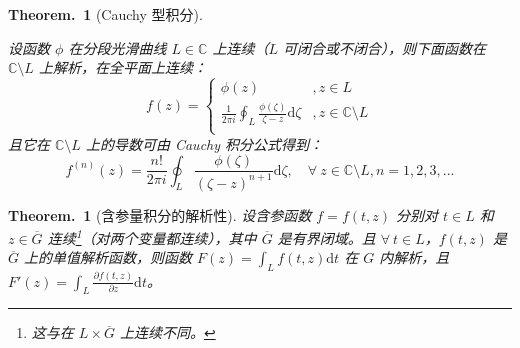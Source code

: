 \documentclass[UTF8]{report}
\def\C{\mathbb{C}}
\theoremstyle{MyLineTheoremStyle} %
\theoremstyle{MyBlockTheoremStyle} %
\newtheorem{BlockTheorem}[LineTheorem]{Theorem.\,} %
\theoremstyle{MySubsubsectionStyle} %
\begin{document}
\begin{BlockTheorem}[Cauchy 型积分]\label{Cauchy 型积分}

设函数 $\phi$ 在分段光滑曲线 $L \in \C$ 上连续（$L$ 可闭合或不闭合），则下面函数在 $\C \setminus L$ 上解析，在全平面上连续：
\begin{equation}
f (z) = 
\begin{cases}
    \phi(z) &, z \in L \\
    \displaystyle \frac{1}{2\pi i}\oint_{L} \frac{\phi(\zeta)}{\zeta - z} \mathrm{d} \zeta &, z \in \C \setminus L \\ 
\end{cases}
\end{equation}
且它在 $\C \setminus L$ 上的导数可由 Cauchy 积分公式得到：
\begin{equation}
f^{(n)}(z) = \frac{n !}{2\pi i}\oint_{L} \frac{\phi(\zeta)}{(\zeta - z)^{n+1}} \mathrm{d} \zeta,\quad \forall\ z \in \C \setminus L, n = 1,2,3,...
\end{equation}

\end{BlockTheorem}

\begin{BlockTheorem}[含参量积分的解析性]\label{含参量积分的解析性}
设含参函数 $f = f(t,z)$ 分别对 $t\in L$ 和 $z\in \overline{G} $ 连续\footnote{这与在 $ L \times \overline{G}$ 上连续不同。}（对两个变量都连续），其中 $\overline{G} $ 是有界闭域。且 $\forall\ t \in L$，$f(t,z)$ 是 $\overline{G}$ 上的单值解析函数，则函数 $\displaystyle F(z) = \int_{L} f(t,z) \mathrm{d}t$
在 $G$ 内解析，且 $\displaystyle F'(z) =  \int_{L} \frac{\partial f(t,z) }{\partial z } \mathrm{d}t$。
\end{BlockTheorem}
\end{document}
